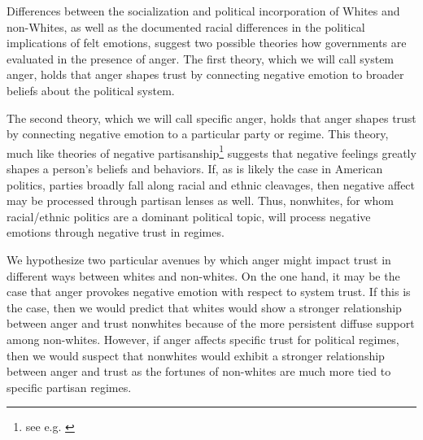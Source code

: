 \documentclass[12t, letterpaper]{article}
\begin{document}
Differences between the socialization and political incorporation of Whites and non-Whites, as well as the documented racial differences in the political implications of felt emotions, suggest two possible theories how governments are evaluated in the presence of anger. The first theory, which we will call system anger, holds that anger shapes trust by connecting negative emotion to broader beliefs about the political system. 

The second theory, which we will call specific anger, holds that anger shapes trust by connecting negative emotion to a particular party or regime. This theory, much like theories of negative partisanship\footnote{see e.g. \cite{abramowitz2016}} suggests that negative feelings greatly shapes a person's beliefs and behaviors. If, as is likely the case in American politics, parties broadly fall along racial and ethnic cleavages, then negative affect may be processed through partisan lenses as well. Thus, nonwhites, for whom racial/ethnic politics are a dominant political topic, will process negative emotions through negative trust in regimes.

We hypothesize two particular avenues by which anger might impact trust in different ways between whites and non-whites. On the one hand, it may be the case that anger provokes negative emotion with respect to system trust. If this is the case, then we would predict that whites would show a stronger relationship between anger and trust nonwhites because of the more persistent diffuse support among non-whites. However, if anger affects specific trust for political regimes, then we would suspect that nonwhites would exhibit a stronger relationship between anger and trust as the fortunes of non-whites are much more tied to specific partisan regimes.


\end{document}
